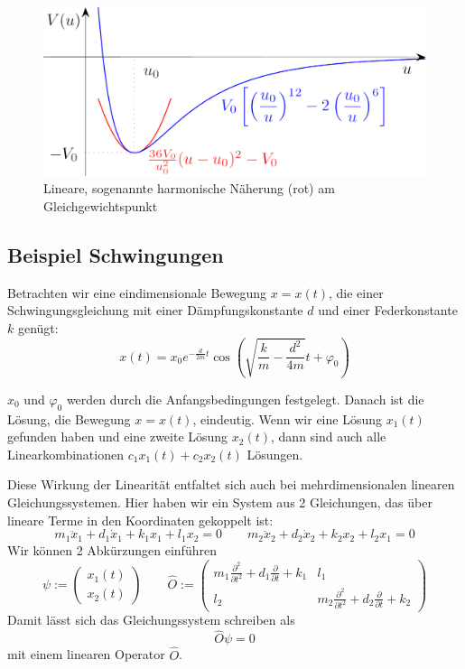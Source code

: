 \documentclass[12pt]{book}
\begin{document}
\begin{figure}[!h]\begin{center}
  \includegraphics[width=13cm]{Bilder/Harmonische_Naeherung.png}
  \caption{Lineare, sogenannte harmonische Näherung (rot) am Gleichgewichtspunkt}
  \label{fig:harmonic_approximation}
\end{center}\end{figure}

\subsection{Beispiel Schwingungen}

Betrachten wir eine eindimensionale Bewegung $x=x(t)$, die einer Schwingungsgleichung mit einer Dämpfungskonstante $d$ und einer Federkonstante $k$ genügt:
\begin{equation*} 
x(t)=x_0 e^{-\frac{d}{2m} t}\cos(\sqrt{ \frac{k}{m} - \frac{d^2}{4m} } t+ \varphi_0)\end{equation*}

$x_0$ und $\varphi_0$ werden durch die Anfangsbedingungen festgelegt. Danach ist die Lösung, die Bewegung $x=x(t)$, eindeutig. Wenn wir eine Lösung $x_1(t)$ gefunden haben und eine zweite Lösung $x_2(t)$, dann sind auch alle Linearkombinationen $c_1 x_1(t)+ c_2 x_2(t)$ Lösungen.

Diese Wirkung der Linearität entfaltet sich auch bei mehrdimensionalen linearen Gleichungssystemen. Hier haben wir ein System aus 2 Gleichungen, das über lineare Terme in den Koordinaten gekoppelt ist:
\begin{equation*} 
m_1 \ddot x_1 + d_1 \dot x_1 + k_1 x_1 + l_1 x_2 = 0 \quad \quad m_2 \ddot x_2 + d_2 \dot x_2 + k_2 x_2 + l_2 x_1 = 0 
\end{equation*}
Wir können 2 Abkürzungen einführen
\begin{equation*} 
\psi := \begin{pmatrix} x_1(t) \\ x_2(t) \end{pmatrix} \quad \quad \hat{O} := \begin{pmatrix} m_1 \frac{\partial^2}{\partial t^2} + d_1 \frac{\partial}{\partial t} + k_1 & l_1 \\ l_2 & m_2 \frac{\partial^2}{\partial t^2} + d_2 \frac{\partial}{\partial t} + k_2 \end{pmatrix} 
\end{equation*}
Damit lässt sich das Gleichungssystem schreiben als
\begin{equation*} 
\hat{O} \psi = 0 
\end{equation*}
mit einem linearen Operator $\hat{O}$.
\end{document}
